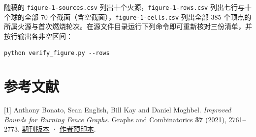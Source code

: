 \documentclass[UTF8,a4paper,11pt,fontset=fandol]{ctexart}
\begin{document}
随稿的 \texttt{figure-1-sources.csv} 列出十个火源，\texttt{figure-1-rows.csv} 列出七行与十个球的全部 70 个截面（含空截面），\texttt{figure-1-cells.csv} 列出全部 385 个顶点的所属火源与首次燃烧轮次。在源文件目录运行下列命令即可重新核对三份清单，并按行输出各非空区间：

\begin{verbatim}
python verify_figure.py --rows
\end{verbatim}

\section*{参考文献}

[1] Anthony Bonato, Sean English, Bill Kay and Daniel Moghbel. \emph{Improved Bounds for Burning Fence Graphs}. Graphs and Combinatorics \textbf{37} (2021), 2761–2773. \href{https://doi.org/10.1007/s00373-021-02390-x}{期刊版本} · \href{https://arxiv.org/abs/1911.01342}{作者预印本}.
\end{document}
